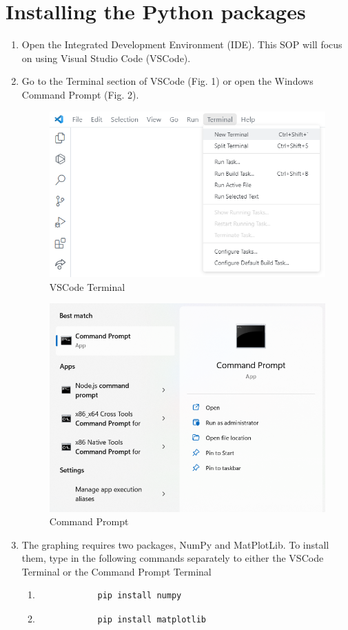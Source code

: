 \documentclass[
11pt, %
a4paper, %
oneside, %
headinclude,footinclude, %
BCOR5mm, %
]{scrartcl}
\begin{document}
\section{Installing the Python packages}
\begin{enumerate}
	\item Open the Integrated Development Environment (IDE). This SOP will focus on using Visual Studio Code (VSCode).
	\item Go to the Terminal section of VSCode (Fig. 1) or open the Windows Command Prompt (Fig. 2).
	\begin{figure}[H]
		\centering %
		\includegraphics[width=0.4\columnwidth]{Figures/Figure1.png} 
		\caption[VSCode Terminal]{VSCode Terminal} %
		\label{fig:gallery} 
	\end{figure}
	\begin{figure}[H]
		\centering %
		\includegraphics[width=0.4\columnwidth]{Figures/Figure2.png} 
		\caption[Command Prompt]{Command Prompt} %
		\label{fig:gallery} 
	\end{figure}
	\item The graphing requires two packages, NumPy and MatPlotLib. To install them, type in the following commands separately to either the VSCode Terminal or the Command Prompt Terminal
	\begin{enumerate}
		\item[] \begin{verbatim}
			pip install numpy
		\end{verbatim}
		\item[] \begin{verbatim}
			pip install matplotlib
		\end{verbatim}
	\end{enumerate}
\end{enumerate}
\end{document}

